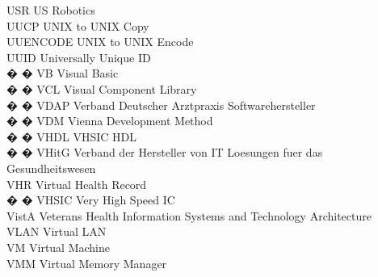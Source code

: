\begin{tabbing}
    \>USR \>\>US Robotics\\

    \>UUCP \>\>UNIX to UNIX Copy\\

    \>UUENCODE \>\>UNIX to UNIX Encode\\

    \>UUID \>\>Universally Unique ID\\



� � \>VB \>\>Visual Basic\\


� � \>VCL \>\>Visual Component Library\\

� � \>VDAP \>\>Verband Deutscher Arztpraxis Softwarehersteller\\


� � \>VDM \>\>Vienna Development Method\\

� � \>VHDL \>\>VHSIC HDL\\

� � \>VHitG \>\>Verband der Hersteller von IT Loesungen fuer das Gesundheitswesen\\

    \>VHR \>\>Virtual Health Record\\

� � \>VHSIC \>\>Very High Speed IC\\


    \>VistA \>\>Veterans Health Information Systems and Technology Architecture\\

    \>VLAN \>\>Virtual LAN\\

    \>VM \>\>Virtual Machine\\

    \>VMM \>\>Virtual Memory Manager\\



\end{tabbing}
